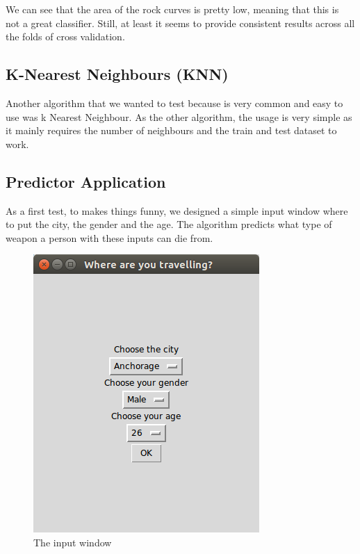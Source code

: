\documentclass[12pt]{report}
\begin{document}
We can see that the area of the rock curves is pretty low, meaning that this is not a great classifier. Still, at least it seems to provide consistent results across all the folds of cross validation.

\subsection{K-Nearest Neighbours (KNN)}
Another algorithm that we wanted to test because is very common and easy to use was k Nearest Neighbour. As the other algorithm, the usage is very simple as it mainly requires the number of neighbours and the train and test dataset to work.
\subsection{Predictor Application}
As a first test, to makes things funny, we designed a simple input window where to put the city, the gender and the age. The algorithm predicts what type of weapon a person with these inputs can die from.

\begin{figure}[!ht]
  \centering
  \includegraphics[width=0.5\linewidth]{../Images/InteractiveApp.png}
  \caption{The input window}
  \label{fig:knnApp}
\end{figure}
\end{document}
